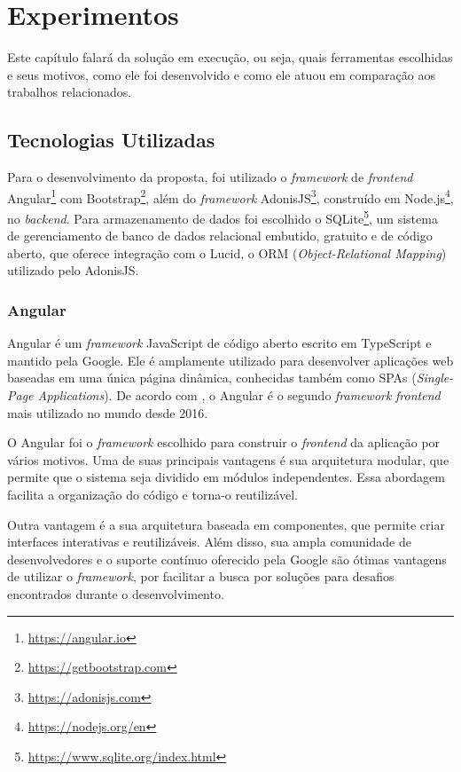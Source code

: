 \chapter{Experimentos}\label{chp:EXPERIMENTOS}

Este capítulo falará da solução em execução, ou seja, quais ferramentas escolhidas e seus motivos, como ele foi desenvolvido e como ele atuou em comparação aos trabalhos relacionados.

\section{Tecnologias Utilizadas}

Para o desenvolvimento da proposta, foi utilizado o \textit{framework} de \textit{frontend} Angular\footnote{\url{https://angular.io}} com Bootstrap\footnote{\url{https://getbootstrap.com}}, além do \textit{framework} AdonisJS\footnote{\url{https://adonisjs.com}}, construído em Node.js\footnote{\url{https://nodejs.org/en}}, no \textit{backend}. Para armazenamento de dados foi escolhido o SQLite\footnote{\url{https://www.sqlite.org/index.html}}, um sistema de gerenciamento de banco de dados relacional embutido, gratuito e de código aberto, que oferece integração com o Lucid, o ORM (\textit{Object-Relational Mapping}) utilizado pelo AdonisJS.

\subsection{Angular}
Angular é um \textit{framework} JavaScript de código aberto escrito em TypeScript e mantido pela Google. Ele é amplamente utilizado para desenvolver aplicações web baseadas em uma única página dinâmica, conhecidas também como SPAs (\textit{Single-Page Applications}). De acordo com , o Angular é o segundo \textit{framework} \textit{frontend} mais utilizado no mundo desde 2016.

O Angular foi o \textit{framework} escolhido para construir o \textit{frontend} da aplicação por vários motivos. Uma de suas principais vantagens é sua arquitetura modular, que permite que o sistema seja dividido em módulos independentes. Essa abordagem facilita a organização do código e torna-o reutilizável. 

Outra vantagem é a sua arquitetura baseada em componentes, que permite criar interfaces interativas e reutilizáveis. Além disso, sua ampla comunidade de desenvolvedores e o suporte contínuo oferecido pela Google são ótimas vantagens de utilizar o \textit{framework}, por facilitar a busca por soluções para desafios encontrados durante o desenvolvimento.

